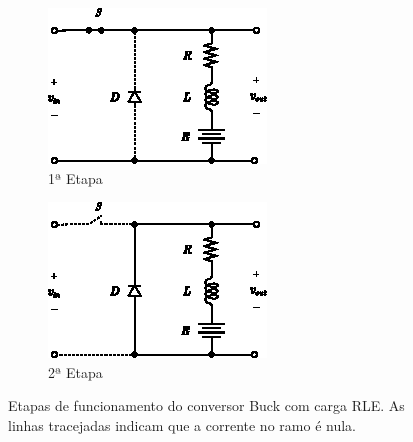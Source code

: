 \begin{figure}[H]
  \captionsetup{justification=centering}
  \centering
  \begin{subfigure}[t]{0.33\textwidth}
    \centering
    \includegraphics[width=\textwidth]{figuras/buck_converter_rle_s1.eps}
    \caption{1ª Etapa}
    \label{fig:buck_converter_rle_s1}
  \end{subfigure}
  \hfil
  \begin{subfigure}[t]{0.33\textwidth}
    \centering
    \includegraphics[width=\textwidth]{figuras/buck_converter_rle_s2.eps}
    \caption{2ª Etapa}
    \label{fig:buck_converter_rle_s2}
  \end{subfigure}
  \caption{Etapas de funcionamento do conversor Buck com carga RLE. As linhas tracejadas indicam que a corrente no ramo é nula.}
  \label{fig:buck_converter_rle}
\end{figure}

